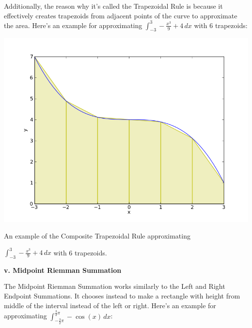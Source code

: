 \documentclass[12pt]{article}
\newcommand{\newLine}{\vspace{5mm}}
\newcommand{\nextsubsection}[1]{\newLine \noindent \large \textbf{#1} \normalsize}
\newcommand{\integral}[3]{\text{$\int^{#2}_{#1} #3\,dx$}}
\begin{document}
\newLine Additionally, the reason why it's called the Trapezoidal Rule is because it effectively creates trapezoids from adjacent points of the curve to approximate the area. Here's an example for approximating $\integral{-3}{3}{-\frac{x^3}{9}+4}$ with 6 trapezoids:

\begin{center} \includegraphics[scale = 0.5]{cubicTrapezoidal.png} 

\small An example of the Composite Trapezoidal Rule approximating 

$\integral{-3}{3}{-\frac{x^3}{9}+4}$ with 6 trapezoids.\normalsize
\end{center}

\nextsubsection{v. Midpoint Riemman Summation}

\newLine The Midpoint Riemman Summation works similarly to the Left and Right Endpoint Summations. It chooses instead to make a rectangle with height from middle of the interval instead of the left or right. Here's an example for approximating $\integral{-\frac{3}{2}\pi}{\frac{3}{2}\pi}{-\cos(x)}$:
\end{document}
